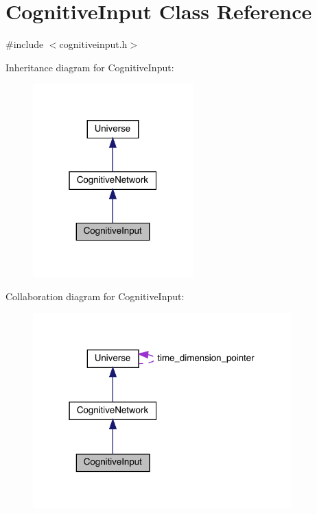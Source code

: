 \hypertarget{class_cognitive_input}{}\section{Cognitive\+Input Class Reference}
\label{class_cognitive_input}


{\ttfamily \#include $<$cognitiveinput.\+h$>$}



Inheritance diagram for Cognitive\+Input\+:\nopagebreak
\begin{figure}[H]
\begin{center}
\leavevmode
\includegraphics[width=175pt]{class_cognitive_input__inherit__graph}
\end{center}
\end{figure}


Collaboration diagram for Cognitive\+Input\+:
\nopagebreak
\begin{figure}[H]
\begin{center}
\leavevmode
\includegraphics[width=283pt]{class_cognitive_input__coll__graph}
\end{center}
\end{figure}
